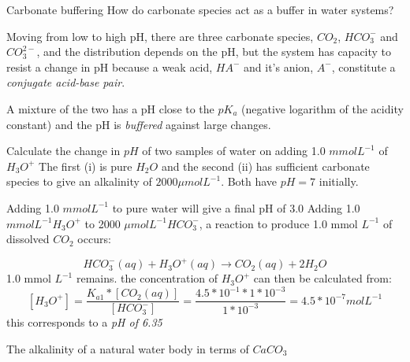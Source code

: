 \documentclass[a4paper,titlepage]{article}
\begin{document}
\begin{frame}{Carbonate buffering}
How do carbonate species act as a buffer in water systems?

\medskip Moving from low to high pH, there are three carbonate species, \(CO_2\),
\(HCO_3^-\) and \(CO_3^{2-}\), and the distribution depends on the pH,
but the system has capacity to resist a change in pH because a weak
acid, \(HA^-\) and it's anion, \(A^-\), constitute a \emph{conjugate
acid-base pair}. 

\medskip A mixture of the two has a pH close to the \(pK_a\)
(negative logarithm of the acidity constant) and the pH is
\emph{buffered} against large changes.
\end{frame}

\begin{frame}
\begin{exampleblock}{Calculate the change in \(pH\) of two samples of water
on adding 1.0 \(mmol L^{-1}\) of \(H_3O^+\)}
The first (i) is pure \(H_2O\) and the second (ii) has sufficient carbonate species to give an
alkalinity of \(2000 \mu mol L^{-1}\).  Both have \(pH = 7\) initially. 

\smallskip Adding 1.0 \(mmol L^{-1}\) to pure water will give a final pH of 3.0 \newline
Adding 1.0 \(mmol L^{-1} H_3O^+\) to 2000 \(\mu mol L^{-1} HCO_3^-\), a
reaction to produce 1.0 mmol \(L^{-1}\) of dissolved \(CO_2\) occurs:

\[ HCO_3^- (aq) + H_3O^+ (aq) \rightarrow CO_2 (aq) + 2H_2O \] 1.0 mmol
\(L^{-1}\) remains. the concentration of \(H_3O^+\) can then be
calculated from:
\[ [H_3O^+] = \frac{K_{a1} * [CO_2(aq)]}{[HCO_3^-]} = \frac{4.5*10^{-1} * 1 * 10^{-3}}{1*10^{-3}} = 4.5*10^{-7} mol L^{-1} \]
this corresponds to a \emph{pH of 6.35}
\end{exampleblock}
\end{frame}

\begin{frame}{The alkalinity of a natural water body in terms of
\(CaCO_3\)}
\end{frame}
\end{document}
